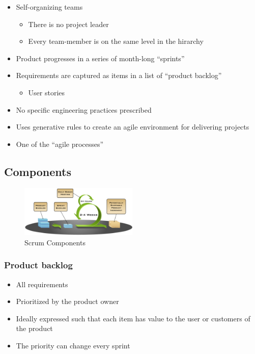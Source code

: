 \begin{itemize}
\tightlist
\item
  Self-organizing teams

  \begin{itemize}
  \tightlist
  \item
    There is no project leader
  \item
    Every team-member is on the same level in the hirarchy
  \end{itemize}
\item
  Product progresses in a series of month-long ``sprints''
\item
  Requirements are captured as items in a list of ``product backlog''

  \begin{itemize}
  \tightlist
  \item
    User stories
  \end{itemize}
\item
  No specific engineering practices prescribed
\item
  Uses generative rules to create an agile environment for delivering
  projects
\item
  One of the ``agile processes''
\end{itemize}

\hypertarget{components}{%
\subsection{Components}\label{components}}

\begin{figure}[H]
\centering
\includegraphics[width=0.5\textwidth]{figures/scrumComponents.png}
\caption{Scrum Components}
\end{figure}


\hypertarget{product-backlog}{%
\subsubsection{Product backlog}\label{product-backlog}}

\begin{itemize}
\tightlist
\item
  All requirements
\item
  Prioritized by the product owner
\item
  Ideally expressed such that each item has value to the user or
  customers of the product
  
  \item 
  The priority can change every sprint
\end{itemize}

